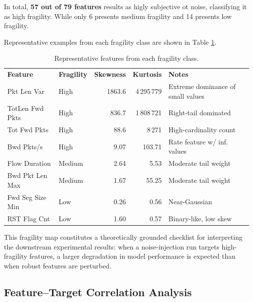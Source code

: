 \documentclass[../main.tex]{subfiles}
\begin{document}
In total, \textbf{57 out of 79 features} results as higly subjective ot noise, classifying it as high fragility. While only 6 presents medium fragility and 14 presents low fragility.

Representative examples from each fragility class are shown in Table \ref{tab:fragility-examples}.

\begin{table}[H]
  \centering
  \caption{Representative features from each fragility class.}
  \label{tab:fragility-examples}
  \small
  \begin{tabular}{llrrl}
    \textbf{Feature} & \textbf{Fragility} & \textbf{Skewness} & \textbf{Kurtosis} & \textbf{Notes} \\
    Pkt Len Var            & High    & 1863.6  & 4\,295\,779 & Extreme dominance of small values \\
    TotLen Fwd Pkts        & High    & 836.7   & 1\,808\,721 & Right-tail dominated \\
    Tot Fwd Pkts           & High    & 88.6    & 8\,271      & High-cardinality count \\
    Bwd Pkts/s             & High    & 9.07    & 103.71      & Rate feature w/ inf. values \\
    Flow Duration          & Medium  & 2.64    & 5.53        & Moderate tail weight \\
    Bwd Pkt Len Max        & Medium  & 1.67    & 55.25       & Moderate tail weight \\
    Fwd Seg Size Min       & Low     & 0.26    & 0.56        & Near-Gaussian \\
    RST Flag Cnt           & Low     & 1.60    & 0.57        & Binary-like, low skew \\
  \end{tabular}
\end{table}

This fragility map constitutes a theoretically grounded checklist for
interpreting the downstream experimental results: when a noise-injection run
targets high-fragility features, a larger degradation in model performance is
expected than when robust features are perturbed.

\newpage
\subsection{Feature–Target Correlation Analysis}
\label{sec:feat-target-corr}
\end{document}
